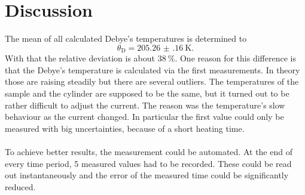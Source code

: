 \section{Discussion}
\label{sec:Diskussion}

The mean of all calculated Debye's temperatures is determined to
\begin{equation}
    \theta_\text{D} = \qty{205.26(16)}{\kelvin}.
\end{equation}
With that the relative deviation is about $\qty{38}{\percent}$.
One reason for this difference is that the Debye's temperature is calculated via the first measurements.
In theory those are raising steadily but there are several outliers. 
The temperatures of the sample and the cylinder are supposed to be the same, but it turned out to be rather difficult to adjust the current.
The reason was the temperature's slow behaviour as the current changed.
In particular the first value could only be measured with big uncertainties, because of a short heating time.
\\
\\
To achieve better results, the measurement could be automated. 
At the end of every time period, 5 measured values had to be recorded. 
These could be read out instantaneously and the error of the measured time could be significantly reduced.